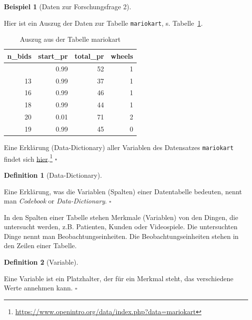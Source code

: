 \documentclass[
  letterpaper,
  oneside,
  open=any]{scrbook}
\theoremstyle{definition}
\theoremstyle{definition}
\newtheorem{example}{Beispiel}[chapter]
\theoremstyle{definition}
\newtheorem{definition}{Definition}[chapter]
\theoremstyle{remark}
\begin{document}
\begin{example}[Daten zur Forschungsfrage
2]\protect\hypertarget{exm-daten}{}\label{exm-daten}

Hier ist ein Auszug der Daten zur Tabelle \texttt{mariokart}, s.
Tabelle~\ref{tbl-mariokart}.

\begin{longtable}[]{@{}rrrr@{}}

\caption{\label{tbl-mariokart}Auszug aus der Tabelle mariokart}

\tabularnewline

\toprule\noalign{}
n\_bids & start\_pr & total\_pr & wheels \\
\midrule\noalign{}
\endhead
\bottomrule\noalign{}
\endlastfoot
20 & 0.99 & 52 & 1 \\
13 & 0.99 & 37 & 1 \\
16 & 0.99 & 46 & 1 \\
18 & 0.99 & 44 & 1 \\
20 & 0.01 & 71 & 2 \\
19 & 0.99 & 45 & 0 \\

\end{longtable}

Eine Erklärung (Data-Dictionary) aller Variablen des Datensatzes
\texttt{mariokart} findet sich
\href{https://www.openintro.org/data/index.php?data=mariokart}{hier}.\footnote{\url{https://www.openintro.org/data/index.php?data=mariokart}}
\(\square\)

\end{example}

\begin{definition}[Data-Dictionary]\protect\hypertarget{def-datadict}{}\label{def-datadict}

Eine Erklärung, was die Variablen (Spalten) einer Datentabelle bedeuten,
nennt man \emph{Codebook} or \emph{Data-Dictionary}. \(\square\)

\end{definition}

In den Spalten einer Tabelle stehen Merkmale (Variablen) von den Dingen,
die untersucht werden, z.B. Patienten, Kunden oder Videospiele. Die
untersuchten Dinge nennt man Beobachtungseinheiten. Die
Beobachtungseinheiten stehen in den Zeilen einer Tabelle.

\begin{definition}[Variable]\protect\hypertarget{def-var}{}\label{def-var}

Eine Variable ist ein Platzhalter, der für ein Merkmal steht, das
verschiedene Werte annehmen kann. \(\square\)

\end{definition}
\end{document}
